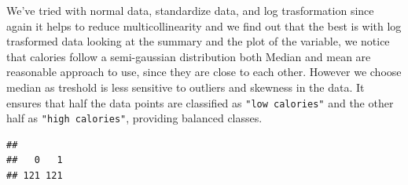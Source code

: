 \documentclass[
]{article}
\newenvironment{Shaded}{\begin{snugshade}}{\end{snugshade}}
\newcommand{\AttributeTok}[1]{\textcolor[rgb]{0.13,0.29,0.53}{#1}}
\newcommand{\DecValTok}[1]{\textcolor[rgb]{0.00,0.00,0.81}{#1}}
\newcommand{\FunctionTok}[1]{\textcolor[rgb]{0.13,0.29,0.53}{\textbf{#1}}}
\newcommand{\NormalTok}[1]{#1}
\newcommand{\OtherTok}[1]{\textcolor[rgb]{0.56,0.35,0.01}{#1}}
\newcommand{\SpecialCharTok}[1]{\textcolor[rgb]{0.81,0.36,0.00}{\textbf{#1}}}
\newcommand{\StringTok}[1]{\textcolor[rgb]{0.31,0.60,0.02}{#1}}
\begin{document}
We've tried with normal data, standardize data, and log trasformation
since again it helps to reduce multicollinearity and we find out that
the best is with log trasformed data looking at the summary and the plot
of the variable, we notice that calories follow a semi-gaussian
distribution both Median and mean are reasonable approach to use, since
they are close to each other. However we choose median as treshold is
less sensitive to outliers and skewness in the data. It ensures that
half the data points are classified as \texttt{"low\ calories"} and the
other half as \texttt{"high\ calories"}, providing balanced classes.

\begin{Shaded}
\end{Shaded}

\begin{verbatim}
## 
##   0   1 
## 121 121
\end{verbatim}

\begin{Shaded}
\end{Shaded}
\end{document}
